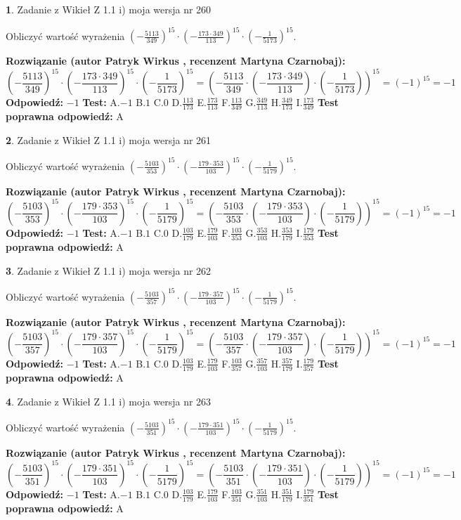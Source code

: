 \documentclass[12pt, a4paper]{article}
\theoremstyle{definition} %
\newtheorem{zad}{}
\newcommand{\zadStart}[1]{\begin{zad}#1\newline}
\newcommand{\zadStop}{\end{zad}}
\newcommand{\rozwStart}[2]{\noindent \textbf{Rozwiązanie (autor #1 , recenzent #2): }\newline}
\newcommand{\rozwStop}{\newline}
\newcommand{\odpStart}{\noindent \textbf{Odpowiedź:}\newline}
\newcommand{\odpStop}{\newline}
\newcommand{\testStart}{\noindent \textbf{Test:}\newline}
\newcommand{\testStop}{\newline}
\newcommand{\kluczStart}{\noindent \textbf{Test poprawna odpowiedź:}\newline}
\newcommand{\kluczStop}{\newline}
\begin{document}
\zadStart{Zadanie z Wikieł Z 1.1 i) moja wersja nr 260}

Obliczyć wartość wyrażenia $(-\frac{5113}{349})^{15} \cdot (-\frac{173 \cdot 349}{113})^{15} \cdot (-\frac{1}{5173})^{15}$.
\zadStop
\rozwStart{Patryk Wirkus}{Martyna Czarnobaj}
$$(-\frac{5113}{349})^{15} \cdot (-\frac{173 \cdot 349}{113})^{15} \cdot (-\frac{1}{5173})^{15} = (-\frac{5113}{349} \cdot (-\frac{173 \cdot 349}{113}) \cdot (-\frac{1}{5173}))^{15} = (-1)^{15} = -1$$
\rozwStop
\odpStart
$-1$
\odpStop
\testStart
A.$-1$ B.$1$ C.$0$ D.$\frac{113}{173}$ E.$\frac{173}{113}$
F.$\frac{113}{349}$ G.$\frac{349}{113}$
H.$\frac{349}{173}$
I.$\frac{173}{349}$
\testStop
\kluczStart
A
\kluczStop



\zadStart{Zadanie z Wikieł Z 1.1 i) moja wersja nr 261}

Obliczyć wartość wyrażenia $(-\frac{5103}{353})^{15} \cdot (-\frac{179 \cdot 353}{103})^{15} \cdot (-\frac{1}{5179})^{15}$.
\zadStop
\rozwStart{Patryk Wirkus}{Martyna Czarnobaj}
$$(-\frac{5103}{353})^{15} \cdot (-\frac{179 \cdot 353}{103})^{15} \cdot (-\frac{1}{5179})^{15} = (-\frac{5103}{353} \cdot (-\frac{179 \cdot 353}{103}) \cdot (-\frac{1}{5179}))^{15} = (-1)^{15} = -1$$
\rozwStop
\odpStart
$-1$
\odpStop
\testStart
A.$-1$ B.$1$ C.$0$ D.$\frac{103}{179}$ E.$\frac{179}{103}$
F.$\frac{103}{353}$ G.$\frac{353}{103}$
H.$\frac{353}{179}$
I.$\frac{179}{353}$
\testStop
\kluczStart
A
\kluczStop



\zadStart{Zadanie z Wikieł Z 1.1 i) moja wersja nr 262}

Obliczyć wartość wyrażenia $(-\frac{5103}{357})^{15} \cdot (-\frac{179 \cdot 357}{103})^{15} \cdot (-\frac{1}{5179})^{15}$.
\zadStop
\rozwStart{Patryk Wirkus}{Martyna Czarnobaj}
$$(-\frac{5103}{357})^{15} \cdot (-\frac{179 \cdot 357}{103})^{15} \cdot (-\frac{1}{5179})^{15} = (-\frac{5103}{357} \cdot (-\frac{179 \cdot 357}{103}) \cdot (-\frac{1}{5179}))^{15} = (-1)^{15} = -1$$
\rozwStop
\odpStart
$-1$
\odpStop
\testStart
A.$-1$ B.$1$ C.$0$ D.$\frac{103}{179}$ E.$\frac{179}{103}$
F.$\frac{103}{357}$ G.$\frac{357}{103}$
H.$\frac{357}{179}$
I.$\frac{179}{357}$
\testStop
\kluczStart
A
\kluczStop



\zadStart{Zadanie z Wikieł Z 1.1 i) moja wersja nr 263}

Obliczyć wartość wyrażenia $(-\frac{5103}{351})^{15} \cdot (-\frac{179 \cdot 351}{103})^{15} \cdot (-\frac{1}{5179})^{15}$.
\zadStop
\rozwStart{Patryk Wirkus}{Martyna Czarnobaj}
$$(-\frac{5103}{351})^{15} \cdot (-\frac{179 \cdot 351}{103})^{15} \cdot (-\frac{1}{5179})^{15} = (-\frac{5103}{351} \cdot (-\frac{179 \cdot 351}{103}) \cdot (-\frac{1}{5179}))^{15} = (-1)^{15} = -1$$
\rozwStop
\odpStart
$-1$
\odpStop
\testStart
A.$-1$ B.$1$ C.$0$ D.$\frac{103}{179}$ E.$\frac{179}{103}$
F.$\frac{103}{351}$ G.$\frac{351}{103}$
H.$\frac{351}{179}$
I.$\frac{179}{351}$
\testStop
\kluczStart
A
\kluczStop
\end{document}
